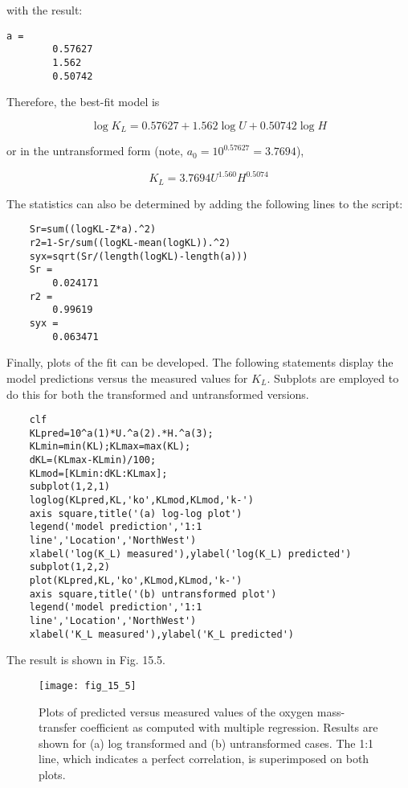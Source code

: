 \documentclass[../main.tex]{subfiles}
\begin{document}
\noindent with the result:

\begin{lstlisting}[numbers=none]
	a =
		0.57627
		1.562
		0.50742
\end{lstlisting}

\noindent Therefore, the best-fit model is

\begin{equation}
	\log K_L = 0.57627 + 1.562 \log U + 0.50742 \log H
\end{equation}

\noindent or in the untransformed form (note, $a_0 = 10^{0.57627} = 3.7694$),

\begin{equation}
	K_L = 3.7694 U^{1.560} H ^ {0.5074}
\end{equation}

\noindent The statistics can also be determined by adding the following lines to the script:

\begin{lstlisting}[numbers=none]
	% Compute fit statistics
	Sr=sum((logKL-Z*a).^2)
	r2=1-Sr/sum((logKL-mean(logKL)).^2)
	syx=sqrt(Sr/(length(logKL)-length(a)))
	Sr =
		0.024171
	r2 =
		0.99619
	syx =
		0.063471
\end{lstlisting}

Finally, plots of the fit can be developed. The following statements display the model
predictions versus the measured values for $K_L$. Subplots are employed to do this for both
the transformed and untransformed versions.

\begin{lstlisting}[numbers=none]
	%Generate plots
	clf
	KLpred=10^a(1)*U.^a(2).*H.^a(3);
	KLmin=min(KL);KLmax=max(KL);
	dKL=(KLmax-KLmin)/100;
	KLmod=[KLmin:dKL:KLmax];
	subplot(1,2,1)
	loglog(KLpred,KL,'ko',KLmod,KLmod,'k-')
	axis square,title('(a) log-log plot')
	legend('model prediction','1:1
	line','Location','NorthWest')
	xlabel('log(K_L) measured'),ylabel('log(K_L) predicted')
	subplot(1,2,2)
	plot(KLpred,KL,'ko',KLmod,KLmod,'k-')
	axis square,title('(b) untransformed plot')
	legend('model prediction','1:1
	line','Location','NorthWest')
	xlabel('K_L measured'),ylabel('K_L predicted')
\end{lstlisting}

\noindent The result is shown in Fig. 15.5.

\begin{figure}[H]
	\centering
	\texttt{[image: fig\_15\_5]}
	\caption{\textsf{Plots of predicted versus measured values of the oxygen mass-transfer coefficient as computed with multiple regression. Results are shown for (a) log transformed and (b) untransformed cases. The 1:1 line, which indicates a perfect correlation, is superimposed on both plots.}}
	\label{fig:fig_15_5}
\end{figure}
\end{document}
